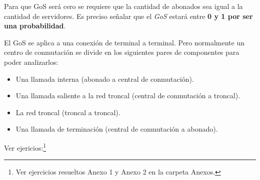 \documentclass[
	12pt, %
	fleqn, %
	a4paper, %
	oneside, %
]{LegrandOrangeBook}
\begin{document}
\begin{remark}
Para que GoS será cero se requiere que la cantidad de abonados sea igual a la cantidad de servidores. Es preciso señalar que el \textit{GoS} estará entre \textbf{0 y 1 por ser una probabilidad}.
\end{remark}
El GoS se aplica a una conexión de terminal a terminal. Pero normalmente un centro de conmutación se divide en los siguientes pares de componentes para poder analizarlos:
\begin{itemize}
\item Una llamada interna (abonado a central de conmutación).
\item Una llamada saliente a la red troncal (central de conmutación a troncal).
\item La red troncal (troncal a troncal).
\item Una llamada de terminación (central de conmutación a abonado).
\end{itemize}
Ver ejericios:\footnote{Ver ejercicios resueltos Anexo 1 y Anexo 2 en la carpeta Anexos.}
\end{document}
